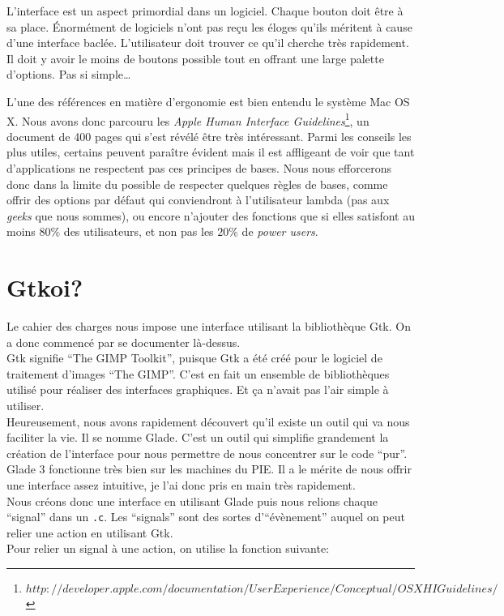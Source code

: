 \documentclass[]{report}
\begin{document}
		L'interface est un aspect primordial dans un logiciel. Chaque bouton doit \^etre \`a sa place. \'Enorm\'ement de logiciels n'ont pas re\c cu les \'eloges qu'ils m\'eritent \`a cause d'une interface bacl\'ee. L'utilisateur doit trouver ce qu'il cherche tr\`es rapidement. Il doit y avoir le moins de boutons possible tout en offrant une large palette d'options. Pas si simple\ldots
		
		L'une des r\'ef\'erences en mati\`ere d'ergonomie est bien entendu le syst\`eme Mac OS X. Nous avons donc parcouru les \emph{Apple Human Interface Guidelines}\footnote{$http://developer.apple.com/documentation/UserExperience/Conceptual/OSXHIGuidelines/$}, un document de 400 pages qui s'est r\'ev\'el\'e \^etre tr\`es int\'eressant. Parmi les conseils les plus utiles, certains peuvent para\^itre \'evident mais il est affligeant de voir que tant d'applications ne respectent pas ces principes de bases. Nous nous efforcerons donc dans la limite du possible de respecter quelques r\`egles de bases, comme offrir des options par d\'efaut qui conviendront \`a l'utilisateur lambda (pas aux \emph{geeks} que nous sommes), ou encore n'ajouter des fonctions que si elles satisfont au moins $80\%$ des utilisateurs, et non pas les $20\%$ de \emph{power users}.
		
		
		\section{Gtkoi?} %
		\label{sec:gtkoi_}
			Le cahier des charges nous impose une interface utilisant la biblioth\`eque Gtk. On a donc commenc\'e par se documenter l\`a-dessus.\\
			Gtk signifie ``The GIMP Toolkit'', puisque Gtk a \'et\'e cr\'e\'e pour le logiciel de traitement d'images ``The GIMP''. C'est en fait un ensemble de biblioth\`eques utilis\'e pour r\'ealiser des interfaces graphiques. Et \c ca n'avait pas l'air simple \`a utiliser.\\
			Heureusement, nous avons rapidement d\'ecouvert qu'il existe un outil qui va nous faciliter la vie. Il se nomme Glade. C'est un outil qui simplifie grandement la cr\'eation de l'interface pour nous permettre de nous concentrer sur le code ``pur''. Glade 3 fonctionne tr\`es bien sur les machines du PIE. Il a le m\'erite de nous offrir une interface assez intuitive, je l'ai donc pris en main tr\`es rapidement.\\
			Nous cr\'eons donc une interface en utilisant Glade puis nous relions chaque ``signal'' dans un \texttt{.c}. Les ``signals'' sont des sortes d'``\'ev\`enement'' auquel on peut relier une action en utilisant Gtk.\\
			Pour relier un signal \`a une action, on utilise la fonction suivante:
\end{document}
